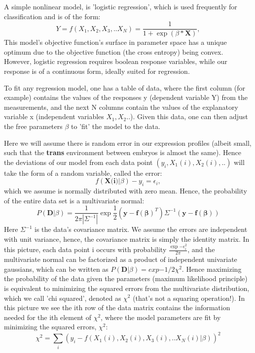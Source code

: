 A simple nonlinear model, is 'logistic regression', which is used frequently for classification and is of the form:
\begin{equation}
Y=f(X_1, X_2, X_3,..X_N)= \frac{1}{1+\exp{(\beta * \textbf{X}) } },
\end{equation}
This model's objective function's surface in parameter space has a unique optimum due to the objective function (the cross entropy) being convex.  However, logistic regression requires boolean response variables, while our response is of a continuous form, ideally suited for regression.  

To fit any regression model, one has a table of data, where the first column (for example) contains the values of the responses y (dependent variable Y) from the measurements, and the next N columns contain the values of the explanatory variable x (independent variables $X_1,X_2..$).  Given this data, one can then adjust the free parameters $\beta$ to 'fit' the model to the data.  

Here we will assume there is random error in our expression profiles (albeit small, such that the \textbf{trans} environment between embryos is almost the same). Hence the deviations of our model from each data point $(y_i, X_1(i),X_2(i),..)$ will take the form of a random variable, called the error: 
\begin{equation}
f(\textbf{X(i)}|\beta) - y_i =\epsilon_i,
\end{equation}
 which we assume is normally distributed with zero mean.  Hence, the probability of the entire data set is a multivariate normal:
\begin{equation}
 P(\mathbf{D}|\beta) = \frac{1}{2\pi |\Sigma^{-1}|}\exp{\frac{1}{2}(\mathbf{y}-\mathbf{f(\beta)}^{T})\Sigma^{-1}(\mathbf{y}-\mathbf{f(\beta)})}
 \end{equation}
 Here $\Sigma^{-1}$ is the data's covariance matrix.  We assume the errors are independent with unit variance, hence, the covariance matrix is simply the identity matrix.  In this picture, each data point i occurs with probability $\frac{\exp{-\epsilon_i^2}}{2\pi}$, and the multivariate normal can be factorized as a product of independent univariate gaussians, which can be written as $P(\mathbf{D}| \beta) = exp{-1/2\chi^2}$.  Hence maximizing the probability of the data given the parameters (maximum likelihood principle) is equivalent to minimizing the squared errors from the multivariate distribution, which we call 'chi squared', denoted as $\chi^2$ (that's not a squaring operation!).  In this picture we see the ith row of the data matrix contains the information needed for the ith element of $\chi^2$, where the model parameters are fit by minimizing the squared errors, $\chi^2$:
\begin{equation}
\chi^2=\sum_i ( y_i - f(X_1(i), X_2(i), X_3(i),..X_N(i)|\beta) )^2
\end{equation}

